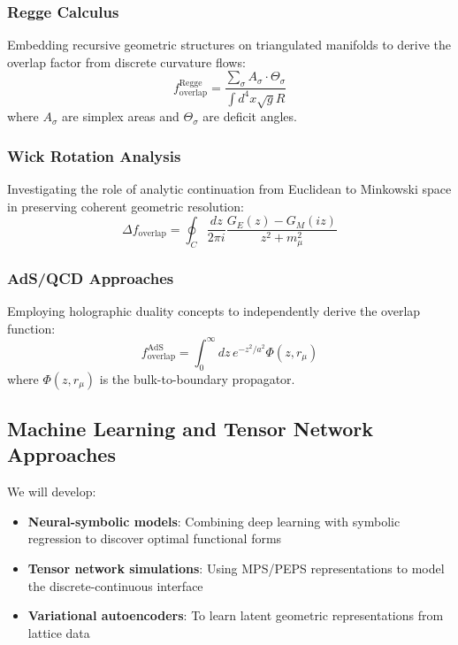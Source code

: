 ﻿\documentclass[12pt]{article}
\theoremstyle{definition}
\theoremstyle{plain}
\begin{document}
\subsubsection{Regge Calculus}
Embedding recursive geometric structures on triangulated manifolds to derive the overlap factor from discrete curvature flows:
\begin{equation}
f_{\mathrm{overlap}}^{\text{Regge}} = \frac{\sum_{\sigma} A_\sigma \cdot \Theta_\sigma}{\int d^4x \sqrt{g} R}
\end{equation}
where $A_\sigma$ are simplex areas and $\Theta_\sigma$ are deficit angles.


\subsubsection{Wick Rotation Analysis}
Investigating the role of analytic continuation from Euclidean to Minkowski space in preserving coherent geometric resolution:
\begin{equation}
\Delta f_{\mathrm{overlap}} = \oint_C \frac{dz}{2\pi i} \frac{G_E(z) - G_M(iz)}{z^2 + m_\mu^2}
\end{equation}


\subsubsection{AdS/QCD Approaches}
Employing holographic duality concepts to independently derive the overlap function:
\begin{equation}
f_{\mathrm{overlap}}^{\text{AdS}} = \int_0^\infty dz \, e^{-z^2/a^2} \Phi(z, r_\mu)
\end{equation}
where $\Phi(z, r_\mu)$ is the bulk-to-boundary propagator.


\subsection{Machine Learning and Tensor Network Approaches}


We will develop:
\begin{itemize}
    \item \textbf{Neural-symbolic models}: Combining deep learning with symbolic regression to discover optimal functional forms
    \item \textbf{Tensor network simulations}: Using MPS/PEPS representations to model the discrete-continuous interface
    \item \textbf{Variational autoencoders}: To learn latent geometric representations from lattice data
\end{itemize}
\end{document}
